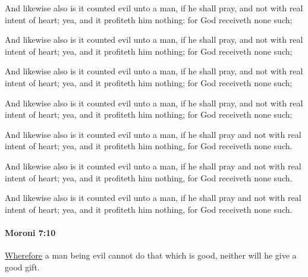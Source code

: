 			\begin{framed}
				\scriptsize
				\begin{compactdesc}
					\item[OM] [\textit{missing}]
					\item[PM] 
					\item[1830] And likewise also is it counted evil unto a man, if he shall pray, and not with real intent of heart; yea, and it profiteth him nothing: for God receiveth none such;
					\item[1837] And likewise also is it counted evil unto a man, if he shall pray, and not with real intent of heart; yea, and it profiteth him nothing; for God receiveth none such;
					\item[1840] And likewise also is it counted evil unto a man, if he shall pray, and not with real intent of heart; yea, and it profiteth him nothing; for God receiveth none such;
					\item[1879] And likewise also is it counted evil unto a man, if he shall pray, and not with real intent of heart; yea, and it profiteth him nothing; for God receiveth none such;
					\item[1920] And likewise also is it counted evil unto a man, if he shall pray and not with real intent of heart; yea, and it profiteth him nothing, for God receiveth none such.
					\item[1981] And likewise also is it counted evil unto a man, if he shall pray and not with real intent of heart; yea, and it profiteth him nothing, for God receiveth none such.
					\item[ABM] And likewise also is it counted evil unto a man, if he shall pray and not with real intent of heart; yea, and it profiteth him nothing, for God receiveth none such. 
				\end{compactdesc}
			\end{framed}

		\paragraph{Moroni 7:10} %
			\label{MORONI-7-10}

			\hyperref[WHEREFORE]{Wherefore} a man being evil cannot do that which is good,
			neither will he give a good gift.
			
